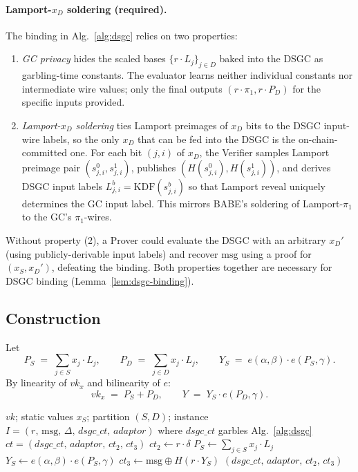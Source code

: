 \documentclass[11pt]{article}
\newcommand{\msg}{\mathrm{msg}}
\newcommand{\Enc}{\mathsf{Enc}}
\begin{document}
\paragraph{Lamport-$x_D$ soldering (required).}
The binding in Alg.~\ref{alg:dsgc} relies on two properties:
\begin{enumerate}
  \item \emph{GC privacy} hides the scaled bases
    $\{r \cdot L_j\}_{j \in D}$ baked into the DSGC as garbling-time
    constants. The evaluator learns neither individual constants nor
    intermediate wire values; only the final outputs
    $(r \cdot \pi_1, r \cdot P_D)$ for the specific inputs provided.
  \item \emph{Lamport-$x_D$ soldering} ties Lamport preimages of
    $x_D$ bits to the DSGC input-wire labels, so the only $x_D$ that
    can be fed into the DSGC is the on-chain-committed one. For each
    bit $(j, i)$ of $x_D$, the Verifier samples Lamport preimage pair
    $(s_{j,i}^0, s_{j,i}^1)$, publishes
    $(H(s_{j,i}^0), H(s_{j,i}^1))$, and derives DSGC input labels
    $L_{j,i}^b = \mathrm{KDF}(s_{j,i}^b)$ so that Lamport reveal
    uniquely determines the GC input label. This mirrors BABE's
    soldering of Lamport-$\pi_1$ to the GC's $\pi_1$-wires.
\end{enumerate}
Without property (2), a Prover could evaluate the DSGC with an
arbitrary $x_D'$ (using publicly-derivable input labels) and recover
$\msg$ using a proof for $(x_S, x_D')$, defeating the binding. Both
properties together are necessary for DSGC binding
(Lemma~\ref{lem:dsgc-binding}).

\subsection{Construction}

Let
\begin{equation}
  P_S \;=\; \sum_{j \in S} x_j \cdot L_j,\qquad
  P_D \;=\; \sum_{j \in D} x_j \cdot L_j,\qquad
  Y_S \;=\; e(\alpha, \beta) \cdot e(P_S, \gamma).
  \label{eq:ys-def}
\end{equation}
By linearity of $vk_x$ and bilinearity of $e$:
\begin{equation}
  vk_x \;=\; P_S + P_D,\qquad
  Y \;=\; Y_S \cdot e(P_D, \gamma).
  \label{eq:y-split}
\end{equation}

\begin{algorithm}[H]
\caption{$\Enc^\star(vk, x_S, S, D;\, I)$ \hfill{\footnotesize Verifier, off-chain, $T_0$}}
\label{alg:pb-enc}
\begin{algorithmic}[1]
\Require $vk$; static values $x_S$; partition $(S, D)$;
  instance $I = (r,\, \msg,\, \Delta,\, dsgc\_ct,\, adaptor)$
  where $dsgc\_ct$ garbles Alg.~\ref{alg:dsgc}
\Ensure $ct = (dsgc\_ct,\, adaptor,\, ct_2,\, ct_3)$
\State $ct_2 \gets r \cdot \delta$
\State $P_S \gets \sum_{j \in S} x_j \cdot L_j$
\State $Y_S \gets e(\alpha, \beta) \cdot e(P_S, \gamma)$
\State $ct_3 \gets \msg \oplus H(r \cdot Y_S)$ 
\State \Return $(dsgc\_ct,\, adaptor,\, ct_2,\, ct_3)$
\end{algorithmic}
\end{algorithm}
\end{document}

